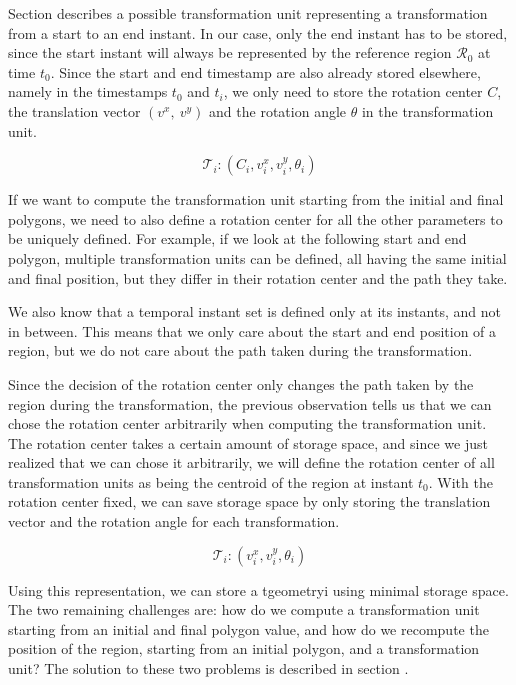 Section  describes a possible transformation unit representing a transformation from a start to an end instant. In our case, only the end instant has to be stored, since the start instant will always be represented by the reference region $\mathcal{R}_0$ at time $t_{0}$. Since the start and end timestamp are also already stored elsewhere, namely in the timestamps $t_0$ and $t_i$, we only need to store the rotation center $C$, the translation vector $(v^x,\ v^y)$ and the rotation angle $\theta$ in the transformation unit.

\[
    \mathcal{T}_i: (C_i, v_i^x, v_i^y, \theta_i)
\]

If we want to compute the transformation unit starting from the initial and final polygons, we need to also define a rotation center for all the other parameters to be uniquely defined. For example, if we look at the following start and end polygon, multiple transformation units can be defined, all having the same initial and final position, but they differ in their rotation center and the path they take.


We also know that a temporal instant set is defined only at its instants, and not in between. This means that we only care about the start and end position of a region, but we do not care about the path taken during the transformation. 

Since the decision of the rotation center only changes the path taken by the region during the transformation, the previous observation tells us that we can chose the rotation center arbitrarily when computing the transformation unit. \\

The rotation center takes a certain amount of storage space, and since we just realized that we can chose it arbitrarily, we will define the rotation center of all transformation units as being the centroid of the region at instant $t_0$. With the rotation center fixed, we can save storage space by only storing the translation vector and the rotation angle for each transformation. 

\[
    \mathcal{T}_i: (v_i^x, v_i^y, \theta_i)
\]

Using this representation, we can store a tgeometryi using minimal storage space. The two remaining challenges are: how do we compute a transformation unit starting from an initial and final polygon value, and how do we recompute the position of the region, starting from an initial polygon, and a transformation unit? The solution to these two problems is described in section . \\

